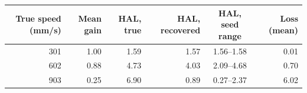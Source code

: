 \begin{tabular}{@{}rrrrcr@{}}
\toprule
True speed (mm/s) & Mean gain & HAL, true & HAL, recovered & HAL, seed range & Loss (mean) \\
\midrule
301 & 1.00 & 1.59 & 1.57 & 1.56--1.58 & 0.01 \\
602 & 0.88 & 4.73 & 4.03 & 2.09--4.68 & 0.70 \\
903 & 0.25 & 6.90 & 0.89 & 0.27--2.37 & 6.02 \\
\bottomrule
\end{tabular}
